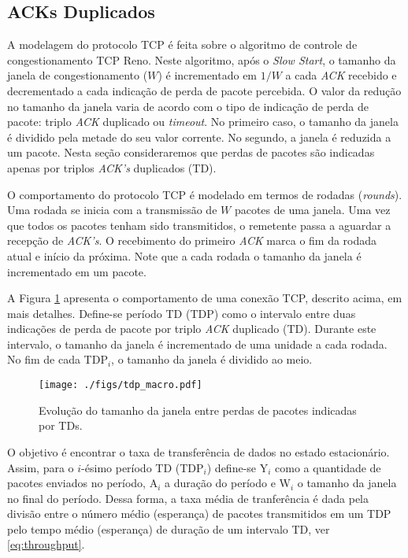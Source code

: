 
\subsection{ACKs Duplicados}
A modelagem do protocolo TCP é feita sobre o algoritmo de controle de congestionamento TCP Reno.
Neste algoritmo, após o \textit{Slow Start}, o tamanho da janela de congestionamento ($W$) é 
incrementado em $1/W$ a cada \textit{ACK} recebido e decrementado a cada indicação de perda 
de pacote percebida. O valor da redução no tamanho da janela varia de acordo com o tipo de indicação de
perda de pacote: triplo \textit{ACK} duplicado ou \textit{timeout}. No primeiro caso, o tamanho
da janela é dividido pela metade do seu valor corrente. No segundo, a janela é reduzida a um 
pacote. Nesta seção consideraremos que perdas de pacotes são indicadas apenas por triplos 
\textit{ACK's} duplicados (TD).

O comportamento do protocolo TCP é modelado em termos de rodadas (\textit{rounds}). Uma rodada
se inicia com a transmissão de $W$ pacotes de uma janela. Uma vez que todos os pacotes tenham sido 
transmitidos, o remetente passa a aguardar a recepção de \textit{ACK's}. O recebimento do primeiro 
\textit{ACK} marca o fim da rodada atual e início da próxima. Note que a cada rodada o tamanho da 
janela é incrementado em um pacote.

A Figura \ref{fig:tdp_macro} apresenta o comportamento de uma conexão TCP, descrito acima, em mais detalhes. 
Define-se período TD (TDP) como o intervalo entre duas indicações de perda de pacote por triplo \textit{ACK} 
duplicado (TD). Durante este intervalo, o tamanho da janela é incrementado de uma unidade a cada rodada. 
No fim de cada TDP$_{i}$, o tamanho da janela é dividido ao meio.

\begin{figure}[ht]
  \centering
  \texttt{[image: ./figs/tdp\_macro.pdf]}
  \caption{Evolução do tamanho da janela entre perdas de pacotes indicadas por TDs.}
  \label{fig:tdp_macro}
\end{figure}

O objetivo é encontrar o taxa de transferência de dados no estado estacionário. Assim, para o $i$-ésimo 
período TD (TDP$_{i}$) define-se Y$_i$ como a quantidade de pacotes enviados no período, A$_i$ a duração 
do período e W$_i$ o tamanho da janela no final do período. Dessa forma, a taxa média de tranferência é
dada pela divisão entre o número médio (esperança) de pacotes transmitidos em um TDP pelo tempo médio 
(esperança) de duração de um intervalo TD, ver \eqref{eq:throughput}.

